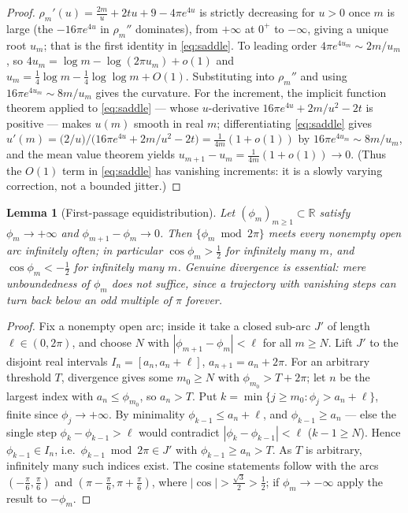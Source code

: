 \documentclass[11pt,reqno]{amsart}
\theoremstyle{plain}
\newtheorem{lemma}[theorem]{Lemma}
\theoremstyle{definition}
\theoremstyle{remark}
\newcommand{\R}{\mathbb R}
\begin{document}
\begin{proof}
$\rho_m'(u)=\tfrac{2m}{u}+2tu+9-4\pi e^{4u}$ is strictly decreasing for
$u>0$ once $m$ is large (the $-16\pi e^{4u}$ in $\rho_m''$ dominates), from
$+\infty$ at $0^+$ to $-\infty$, giving a unique root $u_m$; that is the
first identity in \eqref{eq:saddle}. To leading order
$4\pi e^{4u_m}\sim 2m/u_m$, so $4u_m=\log m-\log(2\pi u_m)+o(1)$ and
$u_m=\tfrac14\log m-\tfrac14\log\log m+O(1)$. Substituting into
$\rho_m''$ and using $16\pi e^{4u_m}\sim 8m/u_m$ gives the curvature. For the
increment, the implicit function theorem applied to \eqref{eq:saddle} ---
whose $u$-derivative $16\pi e^{4u}+2m/u^2-2t$ is positive --- makes $u(m)$
smooth in real $m$; differentiating \eqref{eq:saddle} gives
$u'(m)=\bigl(2/u\bigr)\big/\bigl(16\pi e^{4u}+2m/u^2-2t\bigr)
=\tfrac1{4m}(1+o(1))$ by $16\pi e^{4u_m}\sim8m/u_m$, and the mean value
theorem yields $u_{m+1}-u_m=\tfrac1{4m}(1+o(1))\to0$. (Thus the $O(1)$ term
in \eqref{eq:saddle} has vanishing increments: it is a slowly varying
correction, not a bounded jitter.)
\end{proof}

\begin{lemma}[First-passage equidistribution]\label{lem:firstpassage}
Let $(\phi_m)_{m\ge1}\subset\R$ satisfy $\phi_m\to+\infty$ and
$\phi_{m+1}-\phi_m\to0$. Then $\{\phi_m\bmod2\pi\}$ meets every nonempty open
arc infinitely often; in particular $\cos\phi_m>\tfrac12$ for infinitely many
$m$, and $\cos\phi_m<-\tfrac12$ for infinitely many $m$. Genuine divergence
is essential: mere unboundedness of $\phi_m$ does not suffice, since a
trajectory with vanishing steps can turn back below an odd multiple of $\pi$
forever.
\end{lemma}

\begin{proof}
Fix a nonempty open arc; inside it take a closed sub-arc $J'$ of length
$\ell\in(0,2\pi)$, and choose $N$ with $|\phi_{m+1}-\phi_m|<\ell$ for all
$m\ge N$. Lift $J'$ to the disjoint real intervals $I_n=[a_n,a_n+\ell]$,
$a_{n+1}=a_n+2\pi$. For an arbitrary threshold $T$, divergence gives some
$m_0\ge N$ with $\phi_{m_0}>T+2\pi$; let $n$ be the largest index with
$a_n\le\phi_{m_0}$, so $a_n>T$. Put $k=\min\{j\ge m_0:\phi_j>a_n+\ell\}$,
finite since $\phi_j\to+\infty$. By minimality $\phi_{k-1}\le a_n+\ell$, and
$\phi_{k-1}\ge a_n$ --- else the single step $\phi_k-\phi_{k-1}>\ell$ would
contradict $|\phi_k-\phi_{k-1}|<\ell$ ($k-1\ge N$). Hence $\phi_{k-1}\in I_n$,
i.e.\ $\phi_{k-1}\bmod2\pi\in J'$ with $\phi_{k-1}\ge a_n>T$. As $T$ is
arbitrary, infinitely many such indices exist. The cosine statements follow
with the arcs $(-\tfrac\pi6,\tfrac\pi6)$ and $(\pi-\tfrac\pi6,\pi+\tfrac\pi6)$,
where $|\cos|>\tfrac{\sqrt3}2>\tfrac12$; if $\phi_m\to-\infty$ apply the
result to $-\phi_m$.
\end{proof}
\end{document}
